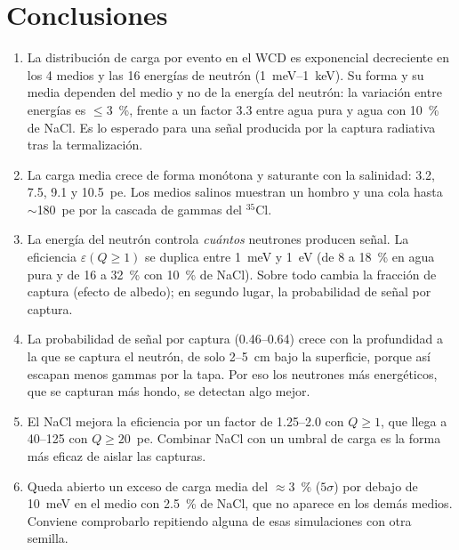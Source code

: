 \documentclass[11pt,a4paper]{article}
\begin{document}
\section{Conclusiones}

\begin{enumerate}
\item La distribución de carga por evento en el WCD es exponencial decreciente en los 4 medios y las 16 energías de neutrón (1~meV--1~keV). Su forma y su media dependen del medio y no de la energía del neutrón: la variación entre energías es $\leq3$~\%, frente a un factor 3.3 entre agua pura y agua con 10~\% de NaCl. Es lo esperado para una señal producida por la captura radiativa tras la termalización.
\item La carga media crece de forma monótona y saturante con la salinidad: 3.2, 7.5, 9.1 y 10.5~pe. Los medios salinos muestran un hombro y una cola hasta $\sim$180~pe por la cascada de gammas del $^{35}$Cl.
\item La energía del neutrón controla \emph{cuántos} neutrones producen señal. La eficiencia $\varepsilon(Q\geq1)$ se duplica entre 1~meV y 1~eV (de 8 a 18~\% en agua pura y de 16 a 32~\% con 10~\% de NaCl). Sobre todo cambia la fracción de captura (efecto de albedo); en segundo lugar, la probabilidad de señal por captura.
\item La probabilidad de señal por captura (0.46--0.64) crece con la profundidad a la que se captura el neutrón, de solo 2--5~cm bajo la superficie, porque así escapan menos gammas por la tapa. Por eso los neutrones más energéticos, que se capturan más hondo, se detectan algo mejor.
\item El NaCl mejora la eficiencia por un factor de 1.25--2.0 con $Q\geq1$, que llega a 40--125 con $Q\geq20$~pe. Combinar NaCl con un umbral de carga es la forma más eficaz de aislar las capturas.
\item Queda abierto un exceso de carga media del $\approx3$~\% ($5\sigma$) por debajo de 10~meV en el medio con 2.5~\% de NaCl, que no aparece en los demás medios. Conviene comprobarlo repitiendo alguna de esas simulaciones con otra semilla.
\end{enumerate}
\end{document}
